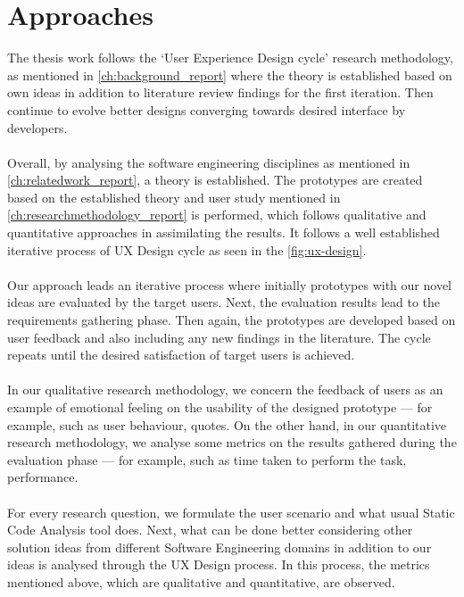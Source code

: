 \chapter{Approaches}
\label{ch:approaches_report}


The thesis work follows the ‘User Experience Design cycle’ research methodology, as mentioned in \autoref{ch:background_report} where the theory is established based on own ideas in addition to literature review findings for the first iteration. Then continue to evolve better designs converging towards desired interface by developers. \\ \\

Overall, by analysing the software engineering disciplines as mentioned in \autoref{ch:relatedwork_report}, a theory is established. The prototypes are created based on the established theory and user study mentioned in \autoref{ch:researchmethodology_report} is performed, which follows qualitative and quantitative approaches in assimilating the results. It follows a well established iterative process of UX Design cycle \cite{UX} as seen in the \autoref{fig:ux-design}. \\ \\

Our approach leads an iterative process where initially prototypes with our novel ideas are evaluated by the target users. Next, the evaluation results lead to the requirements gathering phase. Then again, the prototypes are developed based on user feedback and also including any new findings in the literature. The cycle repeats until the desired satisfaction of target users is achieved. \\ \\

In our qualitative research methodology, we concern the feedback of users as an example of emotional feeling on the usability of the designed prototype — for example, such as user behaviour, quotes. On the other hand, in our quantitative research methodology, we analyse some metrics on the results gathered during the evaluation phase — for example, such as time taken to perform the task, performance. \\ \\

For every research question, we formulate the user scenario and what usual Static Code Analysis tool does. Next, what can be done better considering other solution ideas from different Software Engineering domains in addition to our ideas is analysed through the UX Design process. In this process, the metrics mentioned above, which are qualitative and quantitative, are observed. \\


